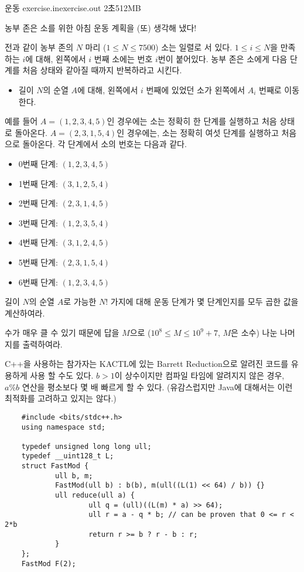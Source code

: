 \begin{problem}{운동}
	{exercise.in}{exercise.out}
	{2초}{512MB}{}
	
	
	농부 존은 소를 위한 아침 운동 계획을 (또) 생각해 냈다!
	
	전과 같이 농부 존의 $N$ 마리 ($1 \le N \le 7500$) 소는 일렬로 서 있다. $1 \le i \le N$을 만족하는 $i$에 대해, 왼쪽에서 $i$ 번째 소에는 번호 $i$번이 붙어있다. 농부 존은 소에게 다음 단계를 처음 상태와 같아질 때까지 반복하라고 시킨다.
	
	\begin{itemize}
		\item 길이 $N$의 순열 $A$에 대해, 왼쪽에서 $i$ 번째에 있었던 소가 왼쪽에서 $A_i$ 번째로 이동한다. 
	\end{itemize}

	예를 들어 $A = (1, 2, 3, 4, 5)$인 경우에는 소는 정확히 한 단계를 실행하고 처음 상태로 돌아온다. $A = (2, 3, 1, 5, 4)$인 경우에는, 소는 정확히 여섯 단계를 실행하고 처음으로 돌아온다. 각 단계에서 소의 번호는 다음과 같다.
	
	\begin{itemize}
		\item 0번째 단계: $(1, 2, 3, 4, 5)$
		\item 1번째 단계: $(3, 1, 2, 5, 4)$
		\item 2번째 단계: $(2, 3, 1, 4, 5)$
		\item 3번째 단계: $(1, 2, 3, 5, 4)$
		\item 4번째 단계: $(3, 1, 2, 4, 5)$
		\item 5번째 단계: $(2, 3, 1, 5, 4)$
		\item 6번째 단계: $(1, 2, 3, 4, 5)$
	\end{itemize}

	길이 $N$의 순열 $A$로 가능한 $N!$ 가지에 대해 운동 단계가 몇 단계인지를 모두 곱한 값을 계산하여라.
	
	수가 매우 클 수 있기 때문에 답을 $M$으로 ($10^8 \le M \le 10^9+7$, $M$은 소수) 나눈 나머지를 출력하여라.
	
	C++을 사용하는 참가자는 KACTL에 있는 Barrett Reduction으로 알려진 코드를 유용하게 사용 할 수도 있다. $b>1$이 상수이지만 컴파일 타임에 알려지지 않은 경우, $a\%b$ 연산을 평소보다 몇 배 빠르게 할 수 있다. (유감스럽지만 Java에 대해서는 이런 최적화를 고려하고 있지는 않다.)
	
	\begin{verbatim}
	#include <bits/stdc++.h>
	using namespace std;
	
	typedef unsigned long long ull;
	typedef __uint128_t L;
	struct FastMod {
	        ull b, m;
	        FastMod(ull b) : b(b), m(ull((L(1) << 64) / b)) {}
	        ull reduce(ull a) {
	                ull q = (ull)((L(m) * a) >> 64);
	                ull r = a - q * b; // can be proven that 0 <= r < 2*b
	                return r >= b ? r - b : r;
	        }
	};
	FastMod F(2);
	

\end{verbatim}
\end{problem}

